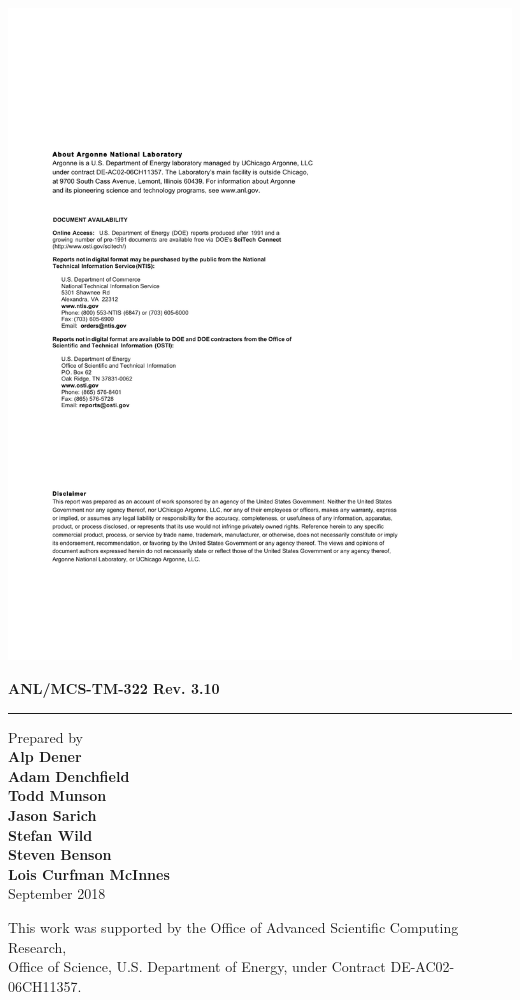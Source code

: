 \newpage
{}
\centerline{\includegraphics{ArgonneReportTemplatePage2}}
\newpage
\restoregeometry


\pagestyle{empty}
\hfill {\large {\bf ANL/MCS-TM-322 Rev. 3.10}}

\vspace*{2in}
\vspace*{8pt}
\hrule
\vspace*{8pt}

\vspace*{0.5in}
\noindent Prepared by \\
{\bf Alp Dener \\ Adam Denchfield \\ Todd Munson \\ Jason Sarich \\ Stefan Wild \\ Steven Benson \\ Lois Curfman McInnes}\\

\vspace*{30pt}
\noindent September 2018

\vspace*{20pt}
\noindent This work was supported by the Office of Advanced Scientific Computing Research, \\
Office of Science, U.S. Department of Energy, under Contract DE-AC02-06CH11357.
